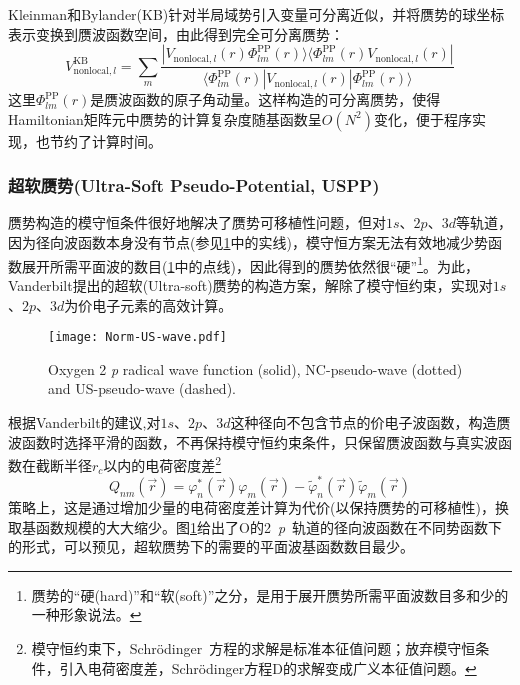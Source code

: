 \textrm{Kleinman}和\textrm{Bylander}\textrm{(KB)}\cite{PRL48-1425_1982}针对半局域势引入变量可分离近似，并将赝势的球坐标表示变换到赝波函数空间，由此得到完全可分离赝势：
$$V_{\mathrm{nonlocal},l}^{\mathrm{KB}}=\sum_m\dfrac{|V_{\mathrm{nonlocal},l}(r)\Phi_{lm}^{\mathrm{PP}}(r)\rangle\langle\Phi_{lm}^{\mathrm{PP}}(r)V_{\mathrm{nonlocal},l}(r)|}{\langle\Phi_{lm}^{\mathrm{PP}}(r)|V_{\mathrm{nonlocal},l}(r)|\Phi_{lm}^{\mathrm{PP}}(r)\rangle}$$
这里$\Phi_{lm}^{\mathrm{PP}}(r)$是赝波函数的原子角动量。这样构造的可分离赝势，使得Hamiltonian矩阵元中赝势的计算复杂度随基函数呈$O(N^2)$变化，便于程序实现，也节约了计算时间。

\subsubsection{超软赝势\textrm{(Ultra-Soft Pseudo-Potential, USPP)}}
赝势构造的模守恒条件很好地解决了赝势可移植性问题，但对$1s$、$2p$、$3d$等轨道，因为径向波函数本身没有节点(参见\ref{Norm-US-wave}中的实线)，模守恒方案无法有效地减少势函数展开所需平面波的数目(\ref{Norm-US-wave}中的点线)，因此得到的赝势依然很“硬”\footnote{赝势的“硬(hard)”和“软(soft)”之分，是用于展开赝势所需平面波数目多和少的一种形象说法。}。为此，\textrm{Vanderbilt}提出的超软\textrm{(Ultra-soft)}赝势\cite{PRB41-7892_1990}的构造方案，解除了模守恒约束，实现对$1s$、$2p$、$3d$为价电子元素的高效计算。
\begin{figure}[h!]
\centering
\texttt{[image: Norm-US-wave.pdf]}
\caption{\small \textrm{Oxygen 2} \textit{p} \textrm{radical wave function (solid), NC-pseudo-wave (dotted) and US-pseudo-wave (dashed).}}%
\label{Norm-US-wave}
\end{figure}

根据\textrm{Vanderbilt}的建议,对$1s$、$2p$、$3d$这种径向不包含节点的价电子波函数，构造赝波函数时选择平滑的函数，不再保持模守恒约束条件，只保留赝波函数与真实波函数在截断半径$r_c$以内的电荷密度差\footnote{模守恒约束下，\textrm{Schr\"odinger~}方程的求解是标准本征值问题；放弃模守恒条件，引入电荷密度差，\textrm{Schr\"odinger}方程D的求解变成广义本征值问题。}
\begin{equation}
	Q_{nm}(\vec r)=\varphi_n^{\ast}(\vec r)\varphi_m(\vec r)-\tilde\varphi_n^{\ast}(\vec r)\tilde\varphi_m(\vec r)
  \label{eq:uspp_4}
\end{equation}
策略上，这是通过增加少量的电荷密度差计算为代价(以保持赝势的可移植性)，换取基函数规模的大大缩少。图\ref{Norm-US-wave}给出了\textrm{O}的2~\textit{p}~轨道的径向波函数在不同势函数下的形式，可以预见，超软赝势下的需要的平面波基函数数目最少。

